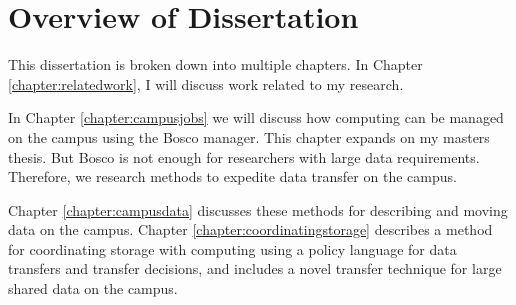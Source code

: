 \section{Overview of Dissertation}

This dissertation is broken down into multiple chapters.  In Chapter \ref{chapter:relatedwork}, I will discuss work related to my research.  

In Chapter \ref{chapter:campusjobs} we will discuss how computing can be managed on the campus using the Bosco manager.  This chapter expands on my masters thesis.  But Bosco is not enough for researchers with large data requirements.  Therefore, we research methods to expedite data transfer on the campus.   

Chapter \ref{chapter:campusdata} discusses these methods for describing and moving data on the campus.  Chapter \ref{chapter:coordinatingstorage} describes a method for coordinating storage with computing using a policy language for data transfers and transfer decisions, and includes a novel transfer technique for large shared data on the campus.




